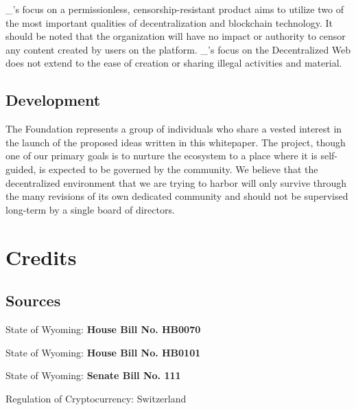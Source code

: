 \documentclass{kwp-builder}
\begin{document}
\tab \konjure\_{’}s focus on a permissionless, censorship-resistant product aims to utilize two of the most important qualities of decentralization and blockchain technology. It should be noted that the \konjure organization will have no impact or authority to censor any content created by users on the platform. \konjure\_{’}s focus on the Decentralized Web does not extend to the ease of creation or sharing illegal activities and material.

\subsection{Development}

\tab The \konjure Foundation represents a group of individuals who share a vested interest in the launch of the proposed ideas written in this whitepaper. The \konjure project, though one of our primary goals is to nurture the ecosystem to a place where it is self-guided, is expected to be governed by the community. We believe that the decentralized environment that we are trying to harbor will only survive through the many revisions of its own dedicated community and should not be supervised long-term by a single board of directors.


\section{Credits}
\subsection{Sources}

\begin{thebibliography}{9}
State of Wyoming: \textbf{House Bill No. HB0070}
\\\texttt{}

State of Wyoming: \textbf{House Bill No. HB0101}
\\\texttt{}

State of Wyoming: \textbf{Senate Bill No. 111}
\\\texttt{}
 
Regulation of Cryptocurrency: Switzerland
\\\texttt{}

\cardano
\\\texttt{}

\ipfs
\\\texttt{ }
\end{thebibliography}
\end{document}
